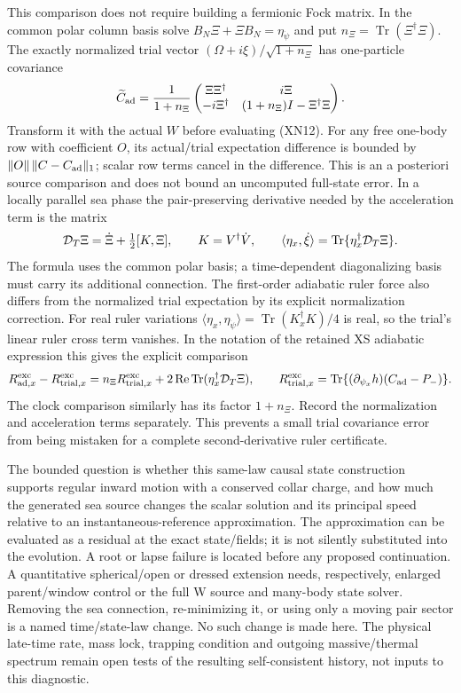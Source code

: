\documentclass[11pt]{article}
\DeclareMathOperator{\Tr}{Tr}
\begin{document}
This comparison does not require building a fermionic Fock matrix.
In the common polar column basis solve
$B_N\Xi+\Xi B_N=\eta_{\dot\psi}$ and put
$n_\Xi=\Tr(\Xi^\dagger\Xi)$.  The exactly normalized trial vector
$(\Omega+i\xi)/\sqrt{1+n_\Xi}$ has one-particle covariance
\[
 \widetilde C_{\rm ad}=\frac1{1+n_\Xi}
 \begin{pmatrix}
   \Xi\Xi^\dagger&i\Xi\\
   -i\Xi^\dagger&(1+n_\Xi)I-\Xi^\dagger\Xi
 \end{pmatrix}.
\]
Transform it with the actual $W$ before evaluating (XN12).
For any free one-body row with coefficient $O$, its actual/trial
expectation difference is bounded by
$\|O\|\,\|C-C_{\rm ad}\|_1$; scalar row terms cancel in the
difference.  This is an a posteriori source comparison and
does not bound an uncomputed full-state error.
In a locally parallel sea phase the pair-preserving derivative
needed by the acceleration term is the matrix
\[
 {\cal D}_T\Xi=\dot\Xi+\tfrac12[K,\Xi],
 \qquad K=V^\dagger\dot V,\qquad
 \langle\eta_x,\dot\xi\rangle
       =\Tr\{\eta_x^\dagger{\cal D}_T\Xi\}.
\]
The formula uses the common polar basis; a time-dependent
diagonalizing basis must carry its additional connection.
The first-order adiabatic ruler force also differs from the
normalized trial expectation by its explicit normalization
correction.  For real ruler variations
$\langle\eta_x,\eta_{\dot\psi}\rangle
=\Tr(K_x^\dagger K)/4$ is real, so the trial's linear ruler
cross term vanishes.  In the notation of the retained XS
adiabatic expression this gives the explicit comparison
\[
 R^{\rm exc}_{{\rm ad},x}-R^{\rm exc}_{{\rm trial},x}
   =n_\Xi R^{\rm exc}_{{\rm trial},x}
          +2\operatorname{Re}\Tr(\eta_x^\dagger{\cal D}_T\Xi),
 \qquad
 R^{\rm exc}_{{\rm trial},x}
   =\Tr\{(\partial_{\psi_x}h)(C_{\rm ad}-P_-)\}.
\]
The clock comparison similarly has its factor $1+n_\Xi$.
Record the normalization and acceleration terms separately.
This prevents a small trial covariance error from being mistaken
for a complete second-derivative ruler certificate.

The bounded question is whether this same-law causal state
construction supports regular inward motion with a conserved
collar charge, and how much the generated sea source changes
the scalar solution and its principal speed relative to an
instantaneous-reference approximation.  The approximation can
be evaluated as a residual at the exact state/fields; it is not
silently substituted into the evolution.  A root or lapse failure
is located before any proposed continuation.  A quantitative
spherical/open or dressed extension needs, respectively, enlarged
parent/window control or the full W source and many-body state
solver.  Removing the sea connection, re-minimizing it, or using
only a moving pair sector is a named time/state-law change.
No such change is made here.  The physical late-time rate,
mass lock, trapping condition and outgoing massive/thermal
spectrum remain open tests of the resulting self-consistent
history, not inputs to this diagnostic.
\end{document}
